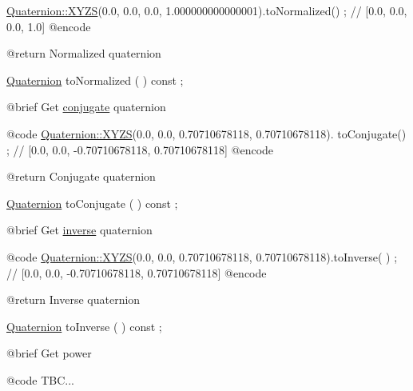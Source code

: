 \begin{DoxyCode}
                        \hyperlink{classlibrary_1_1math_1_1geom_1_1trf_1_1rot_1_1_quaternion_afff9523c7dcbfbbc521736121e62ad41}{Quaternion::XYZS}(0.0, 0.0, 0.0, 1.000000000000001).toNormalized() ;
       \textcolor{comment}{// [0.0, 0.0, 0.0, 1.0]}
    @encode
   
    @\textcolor{keywordflow}{return}             Normalized quaternion

\hyperlink{classlibrary_1_1math_1_1geom_1_1trf_1_1rot_1_1_quaternion_aa7f459a08f5af38b9f7676a6bf36a21c}{Quaternion}              toNormalized                                ( ) \textcolor{keyword}{const} ;

    @brief              Get \hyperlink{classlibrary_1_1math_1_1geom_1_1trf_1_1rot_1_1_quaternion_a4c584b96ce248b069a85adb1c5abd74c}{conjugate} quaternion
   
    @code
                        \hyperlink{classlibrary_1_1math_1_1geom_1_1trf_1_1rot_1_1_quaternion_afff9523c7dcbfbbc521736121e62ad41}{Quaternion::XYZS}(0.0, 0.0, 0.70710678118, 0.70710678118).
      toConjugate() ; \textcolor{comment}{// [0.0, 0.0, -0.70710678118, 0.70710678118]}
    @encode
   
    @\textcolor{keywordflow}{return}             Conjugate quaternion

\hyperlink{classlibrary_1_1math_1_1geom_1_1trf_1_1rot_1_1_quaternion_aa7f459a08f5af38b9f7676a6bf36a21c}{Quaternion}              toConjugate                                 ( ) \textcolor{keyword}{const} ;

    @brief              Get \hyperlink{classlibrary_1_1math_1_1geom_1_1trf_1_1rot_1_1_quaternion_a596228c41391cbba85ca425d9c7c3dbd}{inverse} quaternion
   
    @code
                        \hyperlink{classlibrary_1_1math_1_1geom_1_1trf_1_1rot_1_1_quaternion_afff9523c7dcbfbbc521736121e62ad41}{Quaternion::XYZS}(0.0, 0.0, 0.70710678118, 0.70710678118).toInverse(
      ) ; \textcolor{comment}{// [0.0, 0.0, -0.70710678118, 0.70710678118]}
    @encode
   
    @\textcolor{keywordflow}{return}             Inverse quaternion

\hyperlink{classlibrary_1_1math_1_1geom_1_1trf_1_1rot_1_1_quaternion_aa7f459a08f5af38b9f7676a6bf36a21c}{Quaternion}              toInverse                                   ( ) \textcolor{keyword}{const} ;

    @brief              Get power
   
    @code
                        TBC...
\end{DoxyCode}



